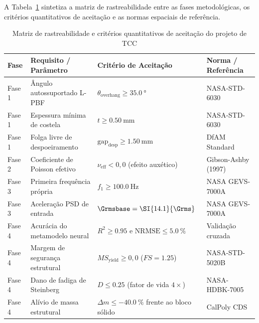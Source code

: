 A Tabela~\ref{tab:rastreabilidade-tcc} sintetiza a matriz de rastreabilidade entre as fases metodológicas, os critérios quantitativos de aceitação e as normas espaciais de referência.

\begin{table}[htb]
  \caption{Matriz de rastreabilidade e critérios quantitativos de aceitação do projeto de TCC}
  \label{tab:rastreabilidade-tcc}
  \centering
  \small
  \SingleSpacing
  \begin{tabularx}{\textwidth}{@{}>{\centering\arraybackslash}p{1.4cm} >{\raggedright\arraybackslash}p{4.2cm} >{\raggedright\arraybackslash}p{4.2cm} >{\centering\arraybackslash}X@{}}
    \toprule
    \textbf{Fase} & \textbf{Requisito / Parâmetro} & \textbf{Critério de Aceitação} & \textbf{Norma / Referência} \\
    \midrule
    Fase 1 & Ângulo autossuportado L-PBF    & $\theta_{\text{overhang}} \ge \SI{35.0}{\degree}$ & NASA-STD-6030 \\
    Fase 1 & Espessura mínima de costela    & $t \ge \SI{0.50}{\milli\metre}$                   & NASA-STD-6030 \\
    Fase 1 & Folga livre de despoeiramento  & $\text{gap}_{\text{desp}} \ge \SI{1.50}{\milli\metre}$ & DfAM Standard \\
    \midrule
    Fase 2 & Coeficiente de Poisson efetivo & $\nu_{\text{eff}} < 0{,}0$ (efeito auxético)      & Gibson-Ashby (1997) \\
    \midrule
    Fase 3 & Primeira frequência própria    & $f_1 \ge \SI{100.0}{\hertz}$                      & NASA GEVS-7000A \\
    Fase 3 & Aceleração PSD de entrada      & $\Grmsbase = \SI{14.1}{\Grms}$                    & NASA GEVS-7000A \\
    \midrule
    Fase 4 & Acurácia do metamodelo neural  & $R^2 \ge \num{0.95}$ e $\text{NRMSE} \le \SI{5.0}{\percent}$ & Validação cruzada \\
    Fase 4 & Margem de segurança estrutural & $MS_{\text{yield}} \ge 0{,}0$ ($FS = \num{1.25}$) & NASA-STD-5020B \\
    Fase 4 & Dano de fadiga de Steinberg    & $D \le \num{0.25}$ (fator de vida $4\times$)      & NASA-HDBK-7005 \\
    Fase 4 & Alívio de massa estrutural     & $\Delta m \le \SI{-40.0}{\percent}$ frente ao bloco sólido & CalPoly CDS \\
    \bottomrule
  \end{tabularx}
\end{table}
